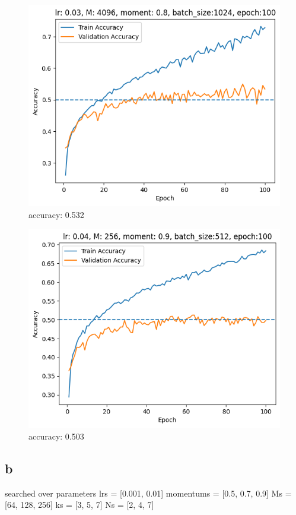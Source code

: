 \begin{figure}[!ht]
    \centering\includegraphics[width=1\linewidth]{A5-1.png}
    \caption{accuracy: 0.532}
\end{figure}


\begin{figure}[!t]
    \centering\includegraphics[width=1\linewidth]{A5-2.png}
    \caption{accuracy: 0.503}
\end{figure}




\clearpage

\subsection{b}
searched over parameters
lrs = [0.001, 0.01]
momentums = [0.5, 0.7, 0.9]
Ms = [64, 128, 256]
ks = [3, 5, 7]
Ns = [2, 4, 7]

